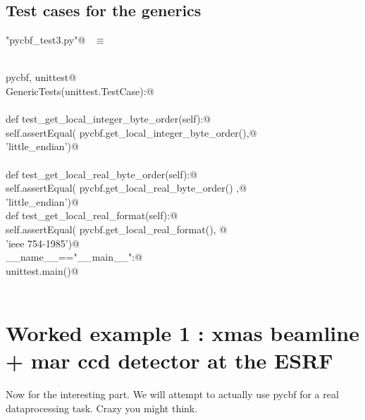 \documentclass[10pt,a4paper,twoside,notitlepage]{article}
\begin{document}
\subsection{Test cases for the generics}

\begin{flushleft} \small \label{scrap19}
\verb@"pycbf_test3.py"@\nobreak\ {\footnotesize {} }$\equiv$
\vspace{-1ex}
\begin{list}{}{} \item
\mbox{}\verb@@\\
\mbox{}\verb@import pycbf, unittest@\\
\mbox{}\verb@class GenericTests(unittest.TestCase):@\\
\mbox{}\verb@@\\
\mbox{}\verb@    def test_get_local_integer_byte_order(self):@\\
\mbox{}\verb@        self.assertEqual( pycbf.get_local_integer_byte_order(),@\\
\mbox{}\verb@                          'little_endian')@\\
\mbox{}\verb@@\\
\mbox{}\verb@    def test_get_local_real_byte_order(self):@\\
\mbox{}\verb@        self.assertEqual( pycbf.get_local_real_byte_order() ,@\\
\mbox{}\verb@                          'little_endian')@\\
\mbox{}\verb@    def test_get_local_real_format(self):@\\
\mbox{}\verb@        self.assertEqual( pycbf.get_local_real_format(), @\\
\mbox{}\verb@                          'ieee 754-1985')@\\
\mbox{}\verb@if __name__=="__main__":@\\
\mbox{}\verb@    unittest.main()@\\
\mbox{}\verb@@\\
\mbox{}\verb@@{\NWsep}
\end{list}
\vspace{-2ex}
\end{flushleft}
\section{Worked example 1 : xmas beamline + mar ccd detector at the ESRF }

Now for the interesting part. We will attempt to actually use pycbf for a real
dataprocessing task. Crazy you might think.
\end{document}
